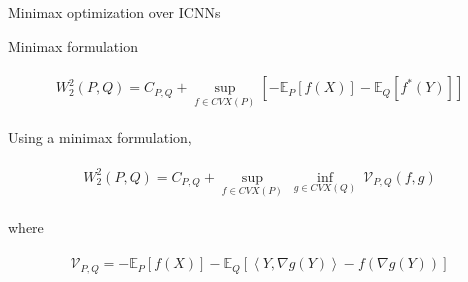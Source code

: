\documentclass{beamer}		%
\begin{document}
\begin{frame}[noframenumbering]

\begin{itemize}

    \begin{LARGE}
    
    \item {}
    
    \item {}
    
    \item Minimax optimization over ICNNs
    
    \item {}

    \end{LARGE}
    
\end{itemize}
    
\end{frame}









\begin{frame}{Minimax formulation}

\begin{eqnarray*}
\begin{aligned}
W_2^2 (P, Q) = C_{P,Q} + \sup_{f \in CVX(P)} \left[- \mathbb{E}_P[f(X)] - \mathbb{E}_Q[f^*(Y)] \right]
\end{aligned}    
\end{eqnarray*}

\pause

Using a minimax formulation, 

\begin{eqnarray}\label{eq:minimmax}
\begin{aligned}
W_2^2 (P, Q) = C_{P,Q} + \sup_{f\in CVX(P)} \ \inf_{g \in CVX(Q)} \  \mathcal{V}_{P,Q} (f,g)
\end{aligned}    
\end{eqnarray}

where

\begin{eqnarray}\label{eq:minimmax}
\begin{aligned}
\mathcal{V}_{P,Q}=-\mathbb{E}_P[f(X)]-\mathbb{E}_Q[\left \langle Y,\nabla g(Y) \right \rangle - f(\nabla g(Y))]
\end{aligned}    
\end{eqnarray}

\end{frame}
\end{document}
